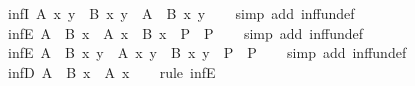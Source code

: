 \begin{isabellebody}
\ inf{}I{\isacharcolon}{\kern0pt}\ {\isachardoublequoteopen}A\ x\ y\ {\isasymLongrightarrow}\ B\ x\ y\ {\isasymLongrightarrow}\ {\isacharparenleft}{\kern0pt}A\ {\isasymsqinter}\ B{\isacharparenright}{\kern0pt}\ x\ y{\isachardoublequoteclose}\isanewline
%
\isadelimproof
\ \ %
\endisadelimproof
%
\isatagproof
{}\isamarkupfalse%
\ {\isacharparenleft}{\kern0pt}simp\ add{\isacharcolon}{\kern0pt}\ inf{\isacharunderscore}{\kern0pt}fun{\isacharunderscore}{\kern0pt}def{\isacharparenright}{\kern0pt}%
\endisatagproof
{\isafoldproof}%
%
\isadelimproof
\isanewline
%
\endisadelimproof
\isanewline
{}\isamarkupfalse%
\ inf{}E{\isacharcolon}{\kern0pt}\ {\isachardoublequoteopen}{\isacharparenleft}{\kern0pt}A\ {\isasymsqinter}\ B{\isacharparenright}{\kern0pt}\ x\ {\isasymLongrightarrow}\ {\isacharparenleft}{\kern0pt}A\ x\ {\isasymLongrightarrow}\ B\ x\ {\isasymLongrightarrow}\ P{\isacharparenright}{\kern0pt}\ {\isasymLongrightarrow}\ P{\isachardoublequoteclose}\isanewline
%
\isadelimproof
\ \ %
\endisadelimproof
%
\isatagproof
{}\isamarkupfalse%
\ {\isacharparenleft}{\kern0pt}simp\ add{\isacharcolon}{\kern0pt}\ inf{\isacharunderscore}{\kern0pt}fun{\isacharunderscore}{\kern0pt}def{\isacharparenright}{\kern0pt}%
\endisatagproof
{\isafoldproof}%
%
\isadelimproof
\isanewline
%
\endisadelimproof
\isanewline
{}\isamarkupfalse%
\ inf{}E{\isacharcolon}{\kern0pt}\ {\isachardoublequoteopen}{\isacharparenleft}{\kern0pt}A\ {\isasymsqinter}\ B{\isacharparenright}{\kern0pt}\ x\ y\ {\isasymLongrightarrow}\ {\isacharparenleft}{\kern0pt}A\ x\ y\ {\isasymLongrightarrow}\ B\ x\ y\ {\isasymLongrightarrow}\ P{\isacharparenright}{\kern0pt}\ {\isasymLongrightarrow}\ P{\isachardoublequoteclose}\isanewline
%
\isadelimproof
\ \ %
\endisadelimproof
%
\isatagproof
{}\isamarkupfalse%
\ {\isacharparenleft}{\kern0pt}simp\ add{\isacharcolon}{\kern0pt}\ inf{\isacharunderscore}{\kern0pt}fun{\isacharunderscore}{\kern0pt}def{\isacharparenright}{\kern0pt}%
\endisatagproof
{\isafoldproof}%
%
\isadelimproof
\isanewline
%
\endisadelimproof
\isanewline
{}\isamarkupfalse%
\ inf{}D{}{\isacharcolon}{\kern0pt}\ {\isachardoublequoteopen}{\isacharparenleft}{\kern0pt}A\ {\isasymsqinter}\ B{\isacharparenright}{\kern0pt}\ x\ {\isasymLongrightarrow}\ A\ x{\isachardoublequoteclose}\isanewline
%
\isadelimproof
\ \ %
\endisadelimproof
%
\isatagproof
{}\isamarkupfalse%
\ {\isacharparenleft}{\kern0pt}rule\ inf{}E{\isacharparenright}{\kern0pt}%
\endisatagproof

\end{isabellebody}
